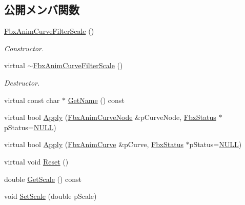 \subsection*{公開メンバ関数}
\begin{DoxyCompactItemize}
\item 
\hyperlink{class_fbx_anim_curve_filter_scale_a8ac5600b1b34f191cb4cab040d9d2ef9}{Fbx\+Anim\+Curve\+Filter\+Scale} ()
\begin{DoxyCompactList}\small\item\em Constructor. \end{DoxyCompactList}\item 
virtual \hyperlink{class_fbx_anim_curve_filter_scale_a2fa5db669596368d0b8cecff75468005}{$\sim$\+Fbx\+Anim\+Curve\+Filter\+Scale} ()
\begin{DoxyCompactList}\small\item\em Destructor. \end{DoxyCompactList}\item 
virtual const char $\ast$ \hyperlink{class_fbx_anim_curve_filter_scale_afffa13f0b3bbdcaa0a6d88d6aea2c83f}{Get\+Name} () const
\item 
virtual bool \hyperlink{class_fbx_anim_curve_filter_scale_abec5cc73d37bef6e8ab3127ed09b21a3}{Apply} (\hyperlink{class_fbx_anim_curve_node}{Fbx\+Anim\+Curve\+Node} \&p\+Curve\+Node, \hyperlink{class_fbx_status}{Fbx\+Status} $\ast$p\+Status=\hyperlink{fbxarch_8h_a070d2ce7b6bb7e5c05602aa8c308d0c4}{N\+U\+LL})
\item 
virtual bool \hyperlink{class_fbx_anim_curve_filter_scale_a1d3234359a5766b4476e4a0522104d77}{Apply} (\hyperlink{class_fbx_anim_curve}{Fbx\+Anim\+Curve} \&p\+Curve, \hyperlink{class_fbx_status}{Fbx\+Status} $\ast$p\+Status=\hyperlink{fbxarch_8h_a070d2ce7b6bb7e5c05602aa8c308d0c4}{N\+U\+LL})
\item 
virtual void \hyperlink{class_fbx_anim_curve_filter_scale_a40e82207d205b026aaab40e52a7184c8}{Reset} ()
\item 
double \hyperlink{class_fbx_anim_curve_filter_scale_a48367ab8cb65db9bffdda7dc8c0afff8}{Get\+Scale} () const
\item 
void \hyperlink{class_fbx_anim_curve_filter_scale_a9c564c7599541607c42d28bb57874eae}{Set\+Scale} (double p\+Scale)
\end{DoxyCompactItemize}
